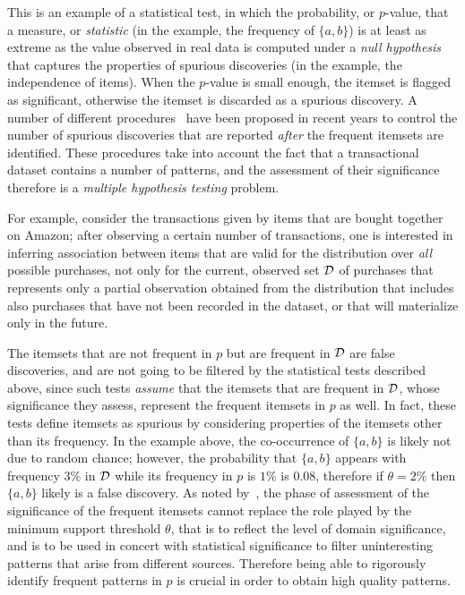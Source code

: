 \iffalse
This is an example of a statistical test, in which the probability, or $p$-value,
that a measure, or \emph{statistic} (in the example, the frequency of $\{a,b\}$)
is at least as extreme as the value observed in real data is computed under a
\emph{null hypothesis} that captures the properties of spurious discoveries (in
the example, the independence of items). When the $p$-value is small enough, the
itemset is flagged as significant, otherwise the itemset is discarded as a
spurious discovery. A number of different procedures~\citep{SilversteinBM98,MegiddoS98,DuMouchelP01,GionisMMT07,Hamalainen10,KirschMAPUV12} have been proposed
in recent years to control the number of spurious discoveries that are reported
\emph{after} the frequent itemsets are identified. These procedures take into
account the fact that a transactional dataset contains a number of patterns, and
the assessment of their significance therefore is a \emph{multiple
hypothesis testing} problem.


For example, consider
the transactions given by items that are bought together on Amazon; after
observing a certain number of transactions, one is interested in inferring
association between items that are valid for the distribution over \emph{all} possible
purchases, not only for the current, observed set ${\cal D}$ of purchases that
represents only a partial observation obtained from the distribution that
includes also purchases that have not been recorded in the dataset, or that will
materialize only in the future.

The itemsets
that are not frequent in $p$ but are frequent in ${\cal D}$ are false discoveries, and are not going to be filtered by
the statistical tests described above, since such tests \emph{assume} that the
itemsets that are frequent in ${\cal D}$, whose significance they assess, represent the frequent itemsets
in $p$ as well. In fact, these tests define itemsets as spurious by considering
properties of the itemsets other than its frequency. In the example above, the
co-occurrence of $\{a,b\}$ is likely not due to random chance; however, the
probability that $\{a,b\}$ appears with frequency $3\%$  in ${\cal D}$ while its
frequency in $p$ is $1\%$ is $0.08$, therefore if $\theta=2\%$ then $\{a,b\}$ likely is a false
discovery. As noted by~\citet{LiuZW11}, the phase of assessment of the
significance of the frequent itemsets cannot replace the role played by the minimum support
threshold $\theta$, that is to reflect the level of domain significance, and is to be used
in concert with statistical significance to filter uninteresting patterns that
arise from different sources. Therefore being able to rigorously identify frequent patterns in $p$ 
is crucial in order to obtain high quality patterns.

